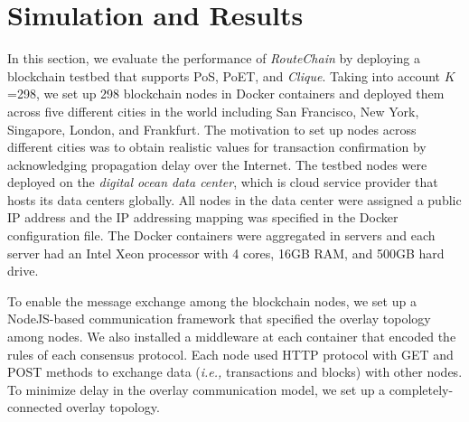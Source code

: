 \documentclass[conference]{IEEEtran}
\newcommand{\rc}{{{\em RouteChain}}\xspace}
\newcommand{\ie}{{\em i.e.,}\xspace}
\begin{document}



\section{Simulation and Results}\label{sec:simulation}
In this section, we evaluate the performance of \rc by deploying a blockchain testbed that supports PoS, PoET, and {\em Clique}. Taking into account $K$=298, we set up 298 blockchain nodes in Docker containers and deployed them across five different cities in the world including San Francisco, New York, Singapore, London, and Frankfurt. The motivation to set up nodes across different cities was to obtain realistic values for transaction confirmation by acknowledging propagation delay over the Internet. The testbed nodes were deployed on the {\em digital ocean data center}, which is cloud service provider that hosts its data centers globally. All nodes in the data center were assigned a public IP address and the IP addressing mapping was specified in the Docker configuration file. The Docker containers were aggregated in servers and each server had an Intel Xeon processor with 4 cores, 16GB RAM, and 500GB hard drive.


To enable the message exchange among the blockchain nodes, we set up a NodeJS-based communication framework that specified the overlay topology among nodes. We also installed a middleware at each container that encoded the rules of each consensus protocol. Each node used HTTP protocol with GET and POST methods to exchange data (\ie transactions and blocks) with other nodes. To minimize delay in the overlay communication model, we set up a completely-connected overlay topology. 
\end{document}
